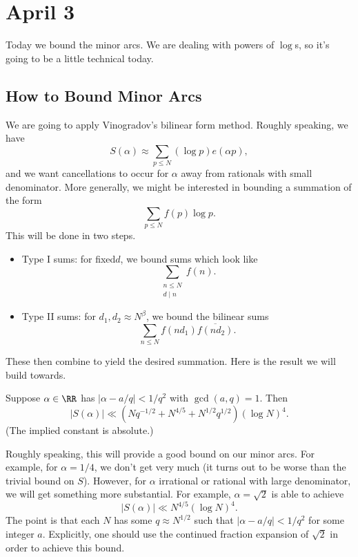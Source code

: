 \documentclass[../notes.tex]{subfiles}
\begin{document}
\section{April 3}

Today we bound the minor arcs. We are dealing with powers of $\log$s, so it's going to be a little technical today.

\subsection{How to Bound Minor Arcs}
We are going to apply Vinogradov's bilinear form  method. Roughly speaking, we have
\[S(\alpha)\approx\sum_{p\le N}(\log p)e(\alpha p),\]
and we want cancellations to occur for $\alpha$ away from rationals with small denominator. More generally, we might be interested in bounding a summation of the form
\[\sum_{p\le N}f(p)\log p.\]
This will be done in two steps.
\begin{itemize}
	\item Type I sums: for fixed$d$, we bound sums which look like
	\[\sum_{\substack{n\le N\\d\mid n}}f(n).\]
	\item Type II sums: for $d_1,d_2\approx N^\beta$, we bound the bilinear sums
	\[\sum_{n\le N}f(nd_1)\overline{f(nd_2)}.\]
\end{itemize}
These then combine to yield the desired summation. Here is the result we will build towards.
\begin{theorem}[Vinogradov] \label{thm:vinogradov-minor}
	Suppose $\alpha\in\RR$ has $|\alpha-a/q|<1/q^2$ with $\gcd(a,q)=1$. Then
	\[|S(\alpha)|\ll\left(Nq^{-1/2}+N^{4/5}+N^{1/2}q^{1/2}\right)(\log N)^4.\]
	(The implied constant is absolute.)
\end{theorem}
Roughly speaking, this will provide a good bound on our minor arcs. For example, for $\alpha=1/4$, we don't get very much (it turns out to be worse than the trivial bound on $S$). However, for $\alpha$ irrational or rational with large denominator, we will get something more substantial. For example, $\alpha=\sqrt2$ is able to achieve
\[|S(\alpha)|\ll N^{4/5}(\log N)^4.\]
The point is that each $N$ has some $q\approx N^{1/2}$ such that $|\alpha-a/q|<1/q^2$ for some integer $a$. Explicitly, one should use the continued fraction expansion of $\sqrt2$ in order to achieve this bound.
\end{document}
